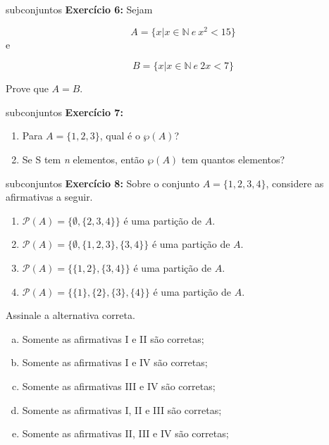 \documentclass[aspectratio=169]{beamer}
\begin{document}
\begin{frame}{subconjuntos}
    \textbf{ Exercício 6:} Sejam

    \[ A = \{x|x \in \mathbb{N} ~ e ~ x^2 < 15\} \]
    e
    
    \[ B = \{x|x \in \mathbb{N} ~ e ~ 2x < 7 \} \]

    Prove que $A = B.$
 
 \end{frame}

\begin{frame}{subconjuntos}
    \textbf{Exercício 7:} 
    
    \begin{enumerate}
        \item Para $A=\{1,2,3\}$, qual é o $\wp(A)$?
        \vspace{4mm}
        \item Se S tem \textit{n} elementos, então $\wp(A)$ tem quantos elementos?
    \end{enumerate}
        
\end{frame}

\begin{frame}{subconjuntos}
    \textbf{Exercício 8: }
    \noindent
Sobre o conjunto $A = \{1, 2, 3, 4\}$, considere as afirmativas a seguir.

\begin{enumerate}
    \item $\mathcal{P}(A) = \{\emptyset, \{2, 3, 4\}\}$ é uma partição de $A$.
    \item $\mathcal{P}(A) = \{\emptyset, \{1, 2, 3\}, \{3, 4\}\}$ é uma partição de $A$.
    \item $\mathcal{P}(A) = \{\{1, 2\}, \{3, 4\}\}$ é uma partição de $A$.
    \item $\mathcal{P}(A) = \{\{1\}, \{2\}, \{3\}, \{4\}\}$ é uma partição de $A$.
\end{enumerate}

\noindent
Assinale a alternativa correta.

\begin{enumerate}[a)]
    \item Somente as afirmativas I e II são corretas;
    \item Somente as afirmativas I e IV são corretas;
    \item Somente as afirmativas III e IV são corretas;
    \item Somente as afirmativas I, II e III são corretas;
    \item Somente as afirmativas II, III e IV são corretas;
\end{enumerate}
\end{frame}
\end{document}
